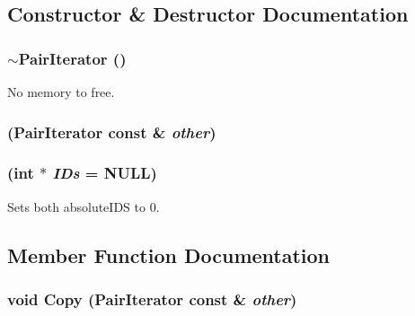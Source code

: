 \subsection{Constructor \& Destructor Documentation}
\hypertarget{classJKBuilder_1_1PairIterator_a129fcb5bc5ef5ddd5760925e80573483}{
\subsubsection[{$\sim$PairIterator}]{\setlength{\rightskip}{0pt plus 5cm}$\sim${\bf PairIterator} ()}}
\label{classJKBuilder_1_1PairIterator_a129fcb5bc5ef5ddd5760925e80573483}


No memory to free. \hypertarget{classJKBuilder_1_1PairIterator_a4863c44859616a6498bd4447b1e3b056}{
\subsubsection[{PairIterator}]{ ({\bf PairIterator} const \& {\em other})}}
\label{classJKBuilder_1_1PairIterator_a4863c44859616a6498bd4447b1e3b056}
\hypertarget{classJKBuilder_1_1PairIterator_a2827cf29cfa8dbb7e254901450b52e5e}{
\subsubsection[{PairIterator}]{ (int $\ast$ {\em IDs} = {\ttfamily NULL})}}
\label{classJKBuilder_1_1PairIterator_a2827cf29cfa8dbb7e254901450b52e5e}


Sets both absoluteIDS to 0. 

\subsection{Member Function Documentation}
\hypertarget{classJKBuilder_1_1PairIterator_ad9163efc0e961126baecc84da6555045}{
\subsubsection[{Copy}]{\setlength{\rightskip}{0pt plus 5cm}void Copy ({\bf PairIterator} const \& {\em other})}}
\label{classJKBuilder_1_1PairIterator_ad9163efc0e961126baecc84da6555045}


